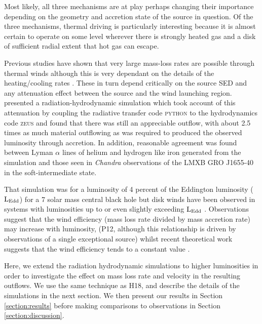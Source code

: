 \documentclass[a4paper,fleqn,usenatbib]{mnras}
\begin{document}
Most likely, all three mechanisms are at play perhaps changing their importance depending on the
geometry and accretion state of the source in question. Of the three mechanisms, thermal driving is 
particularly interesting because it is almost certain to 
operate on some level wherever there is strongly heated gas and a disk of sufficient radial extent that hot gas 
can escape. 

Previous studies have shown that very large mass-loss rates
are possible through thermal winds  \citep{2015ApJ...807..107H} although this is very dependant on the details
 of the heating/cooling rates  \citep{2017ApJ...836...42H}. These 
in turn depend critically on the source SED and any attenuation effect between the source and the wind
launching region. \citet[hereafter H18]{2018MNRAS.479.3651H} presented a radiation-hydrodynamic simulation which 
took account
of this attenuation by coupling the radiative transfer code  \textsc{python} to the hydrodynamics code \textsc{zeus} and 
found that there was still an appreciable outflow, with about 2.5 times as much material outflowing as was required
to produced the observed luminosity through accretion. In addition, reasonable agreement was found between 
Lyman $\alpha$ lines of helium and hydrogen like iron generated from the simulation and those seen in \emph{Chandra} 
observations of the LMXB GRO J1655-40 in the soft-intermediate state. 

That simulation was for a luminosity of 4 percent of the Eddington luminosity  ($\rm{L_{Edd}}$) for a 7 solar mass 
central black hole but disk winds have been observed in systems with luminosities up to or even slightly exceeding 
$\rm{L_{Edd}}$ \citep[][herafter P12]{2012MNRAS.422L..11P}.  Observations
suggest that the wind efficiency (mass loss rate divided by mass accretion rate) may increase with luminosity, 
(P12, although this relationship is driven by observations of a single exceptional source) whilst recent theoretical work 
suggests that the wind efficiency tends to a constant value \citep[][hereafter D18]{2018MNRAS.473..838D}.

Here, we extend the radiation hydrodynamic simulations to higher 
luminosities in order to investigate the effect on mass loss rate and velocity in the resulting outflows. We use the same technique as H18, and describe the details of the simulations in the next section. We then present our results in Section \ref{section:results} before making comparisons to observations in Section \ref{section:discussion}.
\end{document}
